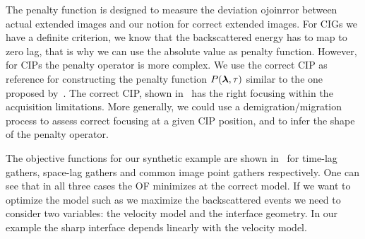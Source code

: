 The penalty function is designed to measure the deviation ojoinrror between actual extended images and our notion for correct 
extended images. For CIGs we have a definite criterion, we know that the backscattered energy has to map
to zero lag, that is why we can use the absolute value as penalty function. However, for CIPs the 
penalty operator is more complex. We use the correct CIP as reference for constructing the penalty function $P({\boldsymbol{\lambda}},\tau)$ similar
to the one proposed by~\citep{tony:cwp12}. The correct CIP, shown in~ has the right focusing within the acquisition limitations.
More generally, we could use a demigration/migration process to assess correct focusing at a given CIP position, and to infer the shape of 
the penalty operator.

The objective functions for our synthetic example are shown in~ for time-lag gathers, space-lag gathers and
common image point gathers respectively. One can see that in all three cases the OF minimizes at the correct model. If we want to optimize the model such as 
we maximize the backscattered events we need to consider two variables: the velocity model and the interface geometry. 
 In our example the sharp interface depends linearly with the velocity model.



